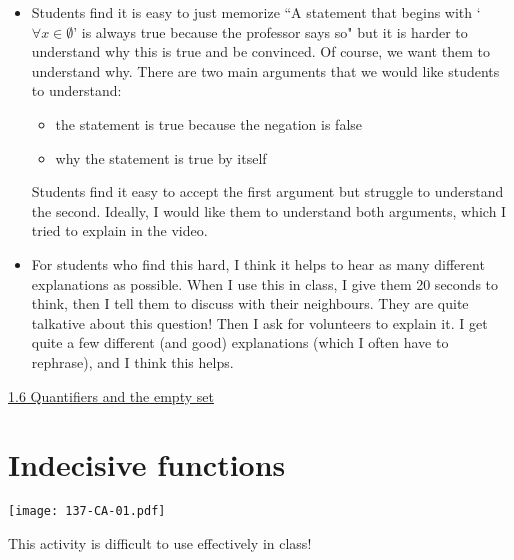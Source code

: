 \documentclass[11pt]{article}
\newcommand{\n}{\newpage}
\newcommand{\nl}{\hfill \vspace{-1.1\baselineskip}} %
\newcommand{\vsix}{\hspace{8mm}\href{https://www.youtube.com/watch?v=WLI1yzvK_5w&list=PLlwePzQY_wW-CPzhk-af-MXj9knthD1gx&index=6}{1.6 Quantifiers and the empty set}}
\begin{document}
\begin{comments}
\nl
\begin{itemize}
	\item   Students find it is easy to just memorize ``A statement that begins with `$\forall x \in \emptyset$' is always true because the professor says so" but it is harder to understand why this is true and be convinced.  Of course, we want them to understand why. There are two main arguments that we would like students to understand:
		\begin{itemize}
		\item the statement is true because the negation is false
		\item why the statement is true by itself
		\end{itemize}
Students find it easy to accept the first argument but struggle to understand the second.  Ideally, I would like them to understand both arguments, which I tried to explain in the video.
	\item  For students who find this hard, I think it helps to hear as many different explanations as possible.  When I use this in class, I give them 20 seconds to think, then I tell them to discuss with their neighbours.   They are quite talkative about this question!  Then I ask for volunteers to explain it.  I get quite a few different (and good) explanations (which I often have to rephrase), and I think this helps.
\end{itemize}
\end{comments}

\begin{videos}
\vsix
\end{videos}

\n
\newpage
\section{Indecisive functions} 

\begin{center}
{ \texttt{[image: 137-CA-01.pdf]}}
\end{center}
\vspace{-.5cm}
\begin{warning}
This activity is difficult to use effectively in class!
\end{warning}
\end{document}

